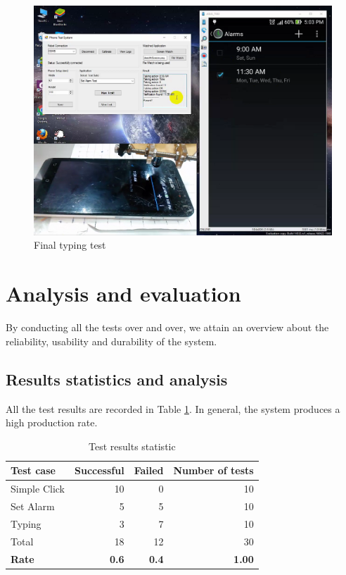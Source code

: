 	\begin{figure}[H]
		\centering
		\includegraphics[scale=0.5]{Chapters/Fig/label_final.png}
		\caption{Final typing test}
		\label{fig:label_final}
	\end{figure}

\section{Analysis and evaluation}
By conducting all the tests over and over, we attain an overview about the reliability, usability and durability of the system.

\subsection{Results statistics and analysis}
All the test results are recorded in Table \ref{tab:result_stat}. In general, the system produces a high production rate.

	\begin{table}[H]
		\centering
		\caption{Test results statistic}	
		\label{tab:result_stat}
		\begin{tabular}{|l|rrr|}
			\hline
			Test case & Successful & Failed & Number of tests \\
			\hline
			Simple Click & 10 & 0 & 10 \\
			Set Alarm & 5 & 5 & 10 \\
			Typing & 3 & 7 & 10 \\
			\hline
			Total & 18 & 12 & 30 \\
			\hline
			\textbf{Rate} & \textbf{0.6} & \textbf{0.4} & \textbf{1.00} \\
			\hline
		\end{tabular}
	\end{table}

